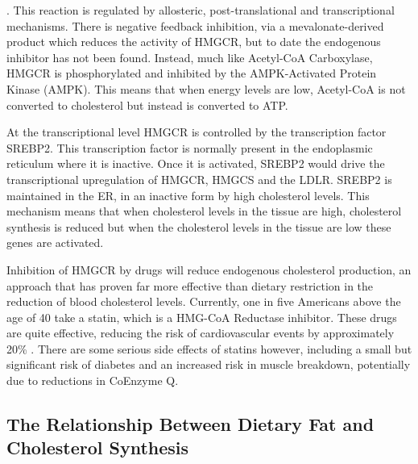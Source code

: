 \documentclass{tufte-handout}
\begin{document}
.  This reaction is regulated by allosteric, post-translational and transcriptional mechanisms.  There is negative feedback inhibition, via a mevalonate-derived product which reduces the activity of HMGCR, but to date the endogenous inhibitor has not been found.  Instead, much like Acetyl-CoA Carboxylase, HMGCR is phosphorylated and inhibited by the AMPK-Activated Protein Kinase (AMPK).  This means that when energy levels are low, Acetyl-CoA is not converted to cholesterol but instead is converted to ATP. 

  At the transcriptional level HMGCR is controlled by the transcription factor SREBP2.  This transcription factor is normally present in the endoplasmic reticulum where it is inactive.  Once it is activated, SREBP2 would drive the transcriptional upregulation of HMGCR, HMGCS and the LDLR.  SREBP2 is maintained in the ER, in an inactive form by high cholesterol levels.  This mechanism means that when cholesterol levels in the tissue are high, cholesterol synthesis is reduced but when the cholesterol levels in the tissue are low these genes are activated.

  Inhibition of HMGCR by drugs will reduce endogenous cholesterol production, an approach that has proven far more effective than dietary restriction in the reduction of blood cholesterol levels. Currently, one in five Americans above the age of 40 take a statin, which is a HMG-CoA Reductase inhibitor.  These drugs are quite effective, reducing the risk of cardiovascular events by approximately 20\% \citep{Treatment2010}.  There are some serious side effects of statins however, including a small but significant risk of diabetes and an increased risk in muscle breakdown, potentially due to reductions in CoEnzyme Q.

\subsection{The Relationship Between Dietary Fat and Cholesterol Synthesis}
\end{document}
